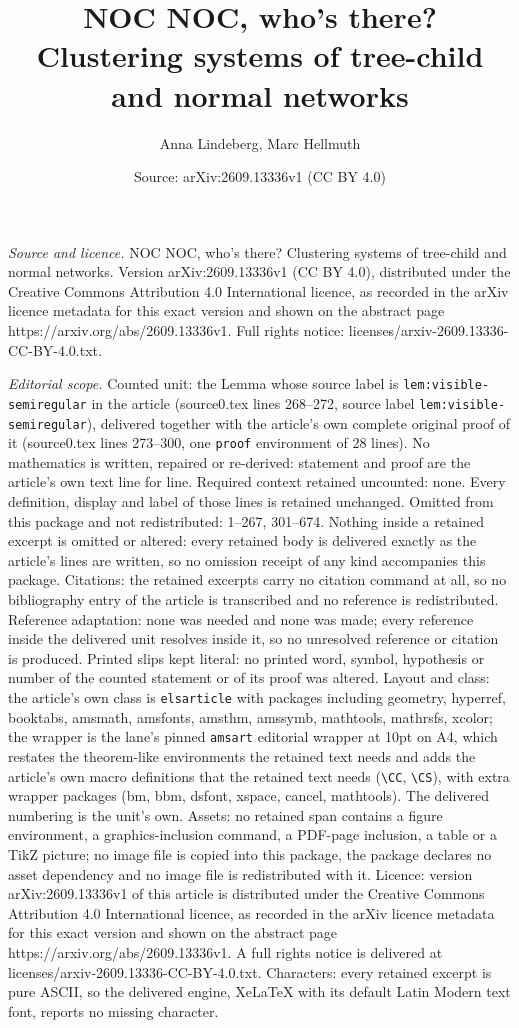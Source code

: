 \documentclass[10pt,a4paper]{amsart}
\title[NOC NOC, who's there? Clustering systems of tree-child and n]{NOC NOC, who's there? Clustering systems of tree-child and normal networks}
\author{Anna Lindeberg, Marc Hellmuth}
\date{Source: arXiv:2609.13336v1 (CC BY 4.0)}
\begin{document}
\maketitle

\noindent\emph{Source and licence.} NOC NOC, who's there? Clustering systems of tree-child and normal networks. Version arXiv:2609.13336v1 (CC BY 4.0), distributed under the Creative Commons Attribution 4.0 International licence, as recorded in the arXiv licence metadata for this exact version and shown on the abstract page https://arxiv.org/abs/2609.13336v1. Full rights notice: licenses/arxiv-2609.13336-CC-BY-4.0.txt.\par\smallskip

\noindent\textit{Editorial scope.} Counted unit: the Lemma whose source label is \texttt{lem:visible-semiregular} in the article (source0.tex lines 268--272, source label \texttt{lem:visible-semiregular}), delivered together with the article's own complete original proof of it (source0.tex lines 273--300, one \texttt{proof} environment of 28 lines). No mathematics is written, repaired or re-derived: statement and proof are the article's own text line for line. Required context retained uncounted: none. Every definition, display and label of those lines is retained unchanged. Omitted from this package and not redistributed: 1--267, 301--674. Nothing inside a retained excerpt is omitted or altered: every retained body is delivered exactly as the article's lines are written, so no omission receipt of any kind accompanies this package. Citations: the retained excerpts carry no citation command at all, so no bibliography entry of the article is transcribed and no reference is redistributed. Reference adaptation: none was needed and none was made; every reference inside the delivered unit resolves inside it, so no unresolved reference or citation is produced. Printed slips kept literal: no printed word, symbol, hypothesis or number of the counted statement or of its proof was altered. Layout and class: the article's own class is \texttt{elsarticle} with packages including geometry, hyperref, booktabs, amsmath, amsfonts, amsthm, amssymb, mathtools, mathrsfs, xcolor; the wrapper is the lane's pinned \texttt{amsart} editorial wrapper at 10pt on A4, which restates the theorem-like environments the retained text needs and adds the article's own macro definitions that the retained text needs (\texttt{\textbackslash CC}, \texttt{\textbackslash CS}), with extra wrapper packages (bm, bbm, dsfont, xspace, cancel, mathtools). The delivered numbering is the unit's own. Assets: no retained span contains a figure environment, a graphics-inclusion command, a PDF-page inclusion, a table or a TikZ picture; no image file is copied into this package, the package declares no asset dependency and no image file is redistributed with it. Licence: version arXiv:2609.13336v1 of this article is distributed under the Creative Commons Attribution 4.0 International licence, as recorded in the arXiv licence metadata for this exact version and shown on the abstract page https://arxiv.org/abs/2609.13336v1. A full rights notice is delivered at licenses/arxiv-2609.13336-CC-BY-4.0.txt. Characters: every retained excerpt is pure ASCII, so the delivered engine, XeLaTeX with its default Latin Modern text font, reports no missing character.
\end{document}
